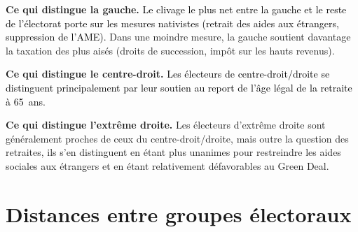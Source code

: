 \documentclass[12pt,french]{article}
\newcommand{\blue}[1]{\textcolor{black}{#1}} %
\begin{document}
\textbf{Ce qui distingue la gauche.} \blue{Le clivage le plus net entre la gauche et le reste de l'électorat porte sur les mesures nativistes (retrait des aides aux étrangers, suppression de l'AME).} Dans une moindre mesure, la gauche soutient davantage la taxation des plus aisés (droits de succession, impôt sur les hauts revenus). %

\textbf{Ce qui distingue le centre-droit.} \blue{Les électeurs de centre-droit/droite se distinguent principalement par leur soutien au report de l'âge légal de 
la retraite à 65~ans.} %

\textbf{Ce qui distingue l'extrême droite.} Les électeurs d'extrême droite sont généralement proches de ceux du centre-droit/droite, mais outre la question des retraites, ils s'en distinguent en étant plus unanimes pour restreindre les aides sociales aux étrangers et en étant relativement défavorables au Green Deal.



\section{Distances entre groupes électoraux}
\label{sec:ecarts}
\end{document}
